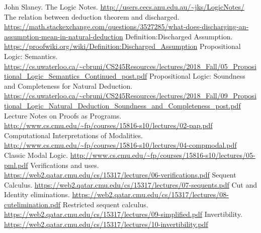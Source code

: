 \documentclass{article}
\theoremstyle{plain}
\theoremstyle{nonumberplain}
\begin{document}
\newpage
\begin{thebibliography}{00}
 John Slaney. The Logic Notes. \newline\url{http://users.cecs.anu.edu.au/~jks/LogicNotes/}
 The relation between deduction theorem and discharged. \newline\url{https://math.stackexchange.com/questions/3527285/what-does-discharging-an-assumption-mean-in-natural-deduction}
 Definition:Discharged Assumption. \newline\url{https://proofwiki.org/wiki/Definition:Discharged_Assumption}
 Propositional Logic: Semantics. \newline\url{https://cs.uwaterloo.ca/~cbruni/CS245Resources/lectures/2018_Fall/05_Propositional_Logic_Semantics_Continued_post.pdf}
 Propositional Logic: Soundness and
Completeness for Natural Deduction. 
\newline\url{https://cs.uwaterloo.ca/~cbruni/CS245Resources/lectures/2018_Fall/09_Propositional_Logic_Natural_Deduction_Soundness_and_Completeness_post.pdf}
 Lecture Notes on Proofs as Programs. \newline\url{http://www.cs.cmu.edu/~fp/courses/15816-s10/lectures/02-pap.pdf}
 Computational Interpretations of Modalities.
\newline\url{http://www.cs.cmu.edu/~fp/courses/15816-s10/lectures/04-compmodal.pdf}
 Classic Modal Logic.
\newline\url{http://www.cs.cmu.edu/~fp/courses/15816-s10/lectures/05-pml.pdf}
 Verifications and uses.
\newline\url{https://web2.qatar.cmu.edu/cs/15317/lectures/06-verifications.pdf}
 Sequent Calculus.
\newline\url{https://web2.qatar.cmu.edu/cs/15317/lectures/07-sequents.pdf}
 Cut and Identity eliminations.
\newline\url{https://web2.qatar.cmu.edu/cs/15317/lectures/08-cutelimination.pdf}
 Restricted sequent calculus.
\newline\url{https://web2.qatar.cmu.edu/cs/15317/lectures/09-simplified.pdf}
 Invertibility.
\newline\url{https://web2.qatar.cmu.edu/cs/15317/lectures/10-invertibility.pdf}
\end{thebibliography}
\end{document}
